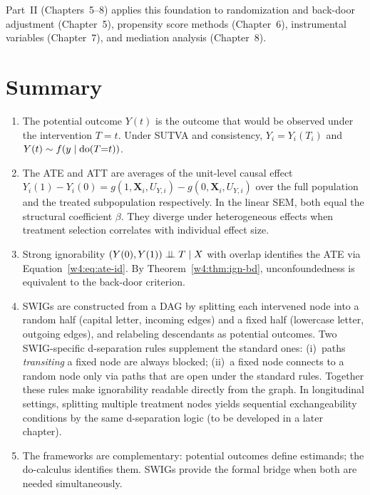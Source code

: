 \documentclass[master.tex]{subfiles}
\begin{document}
\medskip
Part~II (Chapters~5--8) applies this foundation to randomization and
back-door adjustment (Chapter~5), propensity score methods (Chapter~6),
instrumental variables (Chapter~7), and mediation analysis (Chapter~8).

\section{Summary}
\label{w4:sec:summary}

\begin{enumerate}
  \item The potential outcome $Y(t)$ is the outcome that would be observed
        under the intervention $T = t$.  Under SUTVA and consistency,
        $Y_i = Y_i(T_i)$ and $Y(t) \sim f(y \mid \mathrm{do}(T{=}t))$.

  \item The ATE and ATT are averages of the unit-level causal effect
        $Y_i(1) - Y_i(0) = g(1, \mathbf{X}_i, U_{Y,i}) - g(0, \mathbf{X}_i, U_{Y,i})$
        over the full population and the treated subpopulation respectively.
        In the linear SEM, both equal the structural coefficient $\beta$.
        They diverge under heterogeneous effects when treatment selection
        correlates with individual effect size.

  \item Strong ignorability $(Y(0),Y(1)) \perp\!\!\!\perp T \mid X$ with overlap
        identifies the ATE via Equation~\eqref{w4:eq:ate-id}.  By
        Theorem~\ref{w4:thm:ign-bd}, unconfoundedness is equivalent to the
        back-door criterion.

  \item SWIGs \citep{richardson2014ace,bezuidenhout2025swigs} are constructed
        from a DAG by splitting each intervened node into a random half
        (capital letter, incoming edges) and a fixed half (lowercase letter,
        outgoing edges), and relabeling descendants as potential outcomes.
        Two SWIG-specific d-separation rules supplement the standard ones:
        (i)~paths \emph{transiting} a fixed node are always blocked;
        (ii)~a fixed node connects to a random node only via paths that are
        open under the standard rules.  Together these rules make ignorability
        readable directly from the graph.  In longitudinal settings, splitting
        multiple treatment nodes yields sequential exchangeability conditions
        by the same d-separation logic (to be developed in a later chapter).

  \item The frameworks are complementary: potential outcomes define
        estimands; the do-calculus identifies them.  SWIGs provide the
        formal bridge when both are needed simultaneously.
\end{enumerate}
\end{document}
